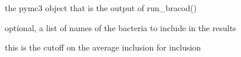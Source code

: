 \documentclass[letterpaper]{book}
\begin{document}
%
\begin{Arguments}
\begin{ldescription}
\item[\code{trace}] the pymc3 object that is the output of run\_bracod()

\item[\code{bug\_names}] optional, a list of names of the bacteria to include in the results

\item[\code{cutoff}] this is the cutoff on the average inclusion for inclusion
\end{ldescription}
\end{Arguments}
\printindex{}
\end{document}
